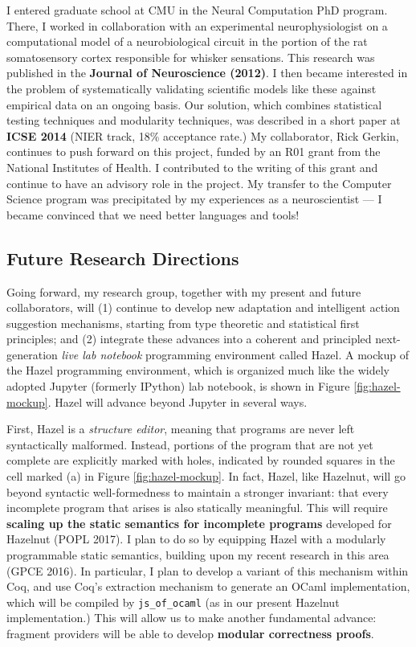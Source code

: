 \documentclass[9pt]{extarticle}
\let\li\lstinline
\begin{document}
I entered graduate school at CMU in the Neural Computation PhD program. There, I worked in collaboration with an experimental neurophysiologist on a computational model of a neurobiological circuit in the portion of the rat somatosensory cortex responsible for whisker sensations. This research was published in the \textbf{Journal of Neuroscience (2012)}. I then became interested in the problem of systematically validating scientific models like these against empirical data on an ongoing basis. Our solution, which combines statistical testing techniques and modularity techniques, was described in a short paper at \textbf{ICSE 2014} (NIER track, 18\% acceptance rate.) My collaborator, Rick Gerkin, continues to push forward on this project, funded by an R01 grant from the National Institutes of Health. I contributed to the writing of this grant and continue to have an advisory role in the project. My transfer to the Computer Science program was precipitated by my experiences as a neuroscientist --- I became convinced that we need better languages and tools!


\vspace{-8px}
\subsection*{Future Research Directions}
\vspace{-4px}

Going forward, my research group, together with my present and future collaborators, will (1) continue to develop new adaptation and intelligent action suggestion mechanisms, starting from type theoretic and statistical first principles; and (2) integrate these advances into a coherent and principled next-generation \emph{live lab notebook} programming environment called Hazel. A mockup of the Hazel programming environment, which is organized much like the widely adopted Jupyter (formerly IPython) lab notebook, is shown in Figure \ref{fig:hazel-mockup}. Hazel will advance beyond Jupyter in several ways. 

First, Hazel is a \emph{structure editor}, meaning that programs are never left syntactically malformed. Instead, portions of the program that are not yet complete are explicitly marked with holes, indicated by rounded squares in the cell marked (a) in Figure \ref{fig:hazel-mockup}. In fact, Hazel, like Hazelnut, will go beyond syntactic well-formedness to maintain a stronger invariant: that every incomplete program that arises is also statically meaningful. This will require \textbf{scaling up the static semantics for incomplete programs} developed for Hazelnut (POPL 2017). I plan to do so by equipping Hazel with a modularly programmable static semantics, building upon my recent research in this area (GPCE 2016). In particular, I plan to develop a variant of this mechanism within Coq, and use Coq's extraction mechanism to generate an OCaml implementation, which will be compiled by \li{js_of_ocaml} (as in our present Hazelnut implementation.) This will allow us to make another fundamental advance: fragment providers will be able to develop \textbf{modular correctness proofs}.
\end{document}

